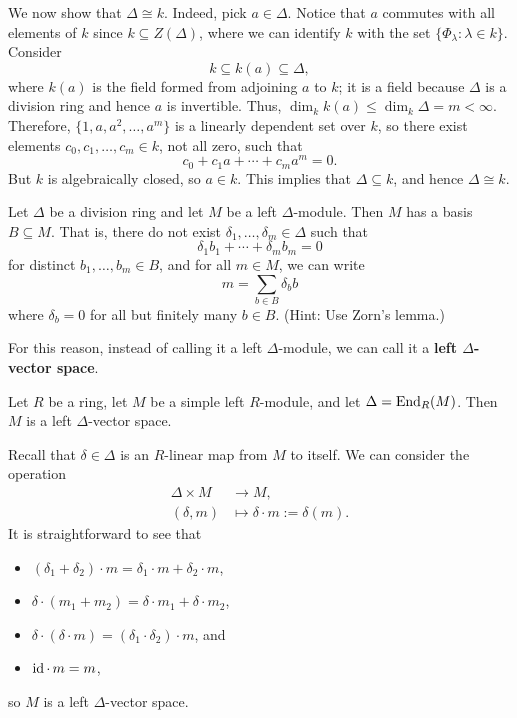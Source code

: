 \begin{pf}
\begin{enumerate}[(a)]
    We now show that $\Delta \cong k$. Indeed, pick $a \in \Delta$. Notice that $a$ commutes 
    with all elements of $k$ since $k \subseteq Z(\Delta)$, where we can identify $k$ with the set 
    $\{\Phi_\lambda : \lambda \in k\}$. Consider 
    \[ k \subseteq k(a) \subseteq \Delta, \]
    where $k(a)$ is the field formed from adjoining $a$ to $k$; it is a field because $\Delta$ 
    is a division ring and hence $a$ is invertible. Thus, $\dim_k k(a) \leq \dim_k \Delta = m < \infty$. 
    Therefore, $\{1, a, a^2, \dots, a^m\}$ is a linearly dependent set over $k$, so there 
    exist elements $c_0, c_1, \dots, c_m \in k$, not all zero, such that 
    \[ c_0 + c_1a + \cdots + c_m a^m = 0. \]
    But $k$ is algebraically closed, so $a \in k$. This implies that $\Delta \subseteq k$, and hence 
    $\Delta \cong k$. \qedhere 
\end{enumerate}
\end{pf}

\begin{exercise}{}
Let $\Delta$ be a division ring and let $M$ be a left $\Delta$-module. Then $M$ has a basis 
$B \subseteq M$. That is, there do not exist $\delta_1, \dots, \delta_m \in \Delta$ such that 
\[ \delta_1 b_1 + \cdots + \delta_m b_m = 0 \]
for distinct $b_1, \dots, b_m \in B$, and for all $m \in M$, we can write 
\[ m = \sum_{b \in B} \delta_b b \]
where $\delta_b = 0$ for all but finitely many $b \in B$. (Hint: Use Zorn's lemma.)
\end{exercise}

For this reason, instead of calling it a left $\Delta$-module, we can call it a 
{\bf left $\Delta$-vector space}.  

\begin{remark}{}
Let $R$ be a ring, let $M$ be a simple left $R$-module, and let $\Delta = \operatorname{End}_R(M)$. Then $M$ 
is a left $\Delta$-vector space. 
\end{remark}
\begin{pf}
Recall that $\delta \in \Delta$ is an $R$-linear map from $M$ to itself. We can consider the operation 
\begin{align*}
    \Delta \times M &\to M, \\
    (\delta, m) &\mapsto \delta \cdot m := \delta(m). 
\end{align*}
It is straightforward to see that 
\begin{itemize}
    \item $(\delta_1 + \delta_2) \cdot m = \delta_1 \cdot m + \delta_2 \cdot m$, 
    \item $\delta \cdot (m_1 + m_2) = \delta \cdot m_1 + \delta \cdot m_2$, 
    \item $\delta \cdot (\delta \cdot m) = (\delta_1 \cdot \delta_2) \cdot m$, and 
    \item $\operatorname{id} \cdot \,m = m$,
\end{itemize} so $M$ is a left $\Delta$-vector space. 
\end{pf}

